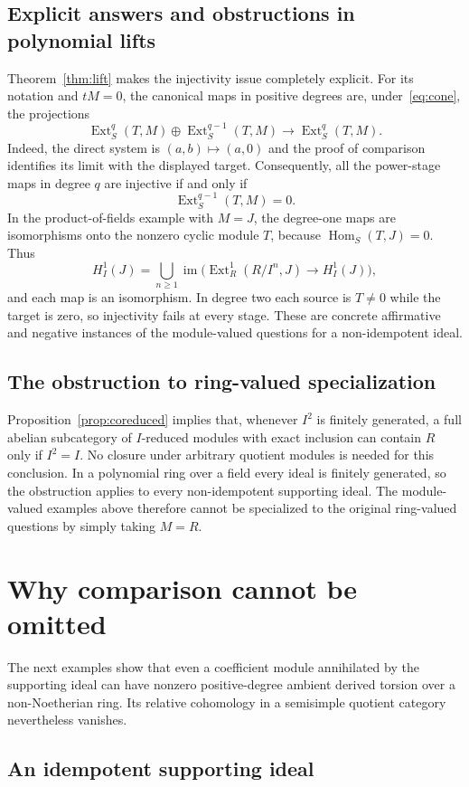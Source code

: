 \documentclass[11pt,reqno]{amsart}
\theoremstyle{definition}
\theoremstyle{remark}
\newcommand{\Hom}{\operatorname{Hom}}
\newcommand{\Ext}{\operatorname{Ext}}
\begin{document}
\subsection{Explicit answers and obstructions in polynomial lifts}
Theorem~\ref{thm:lift} makes the injectivity issue completely explicit. For its notation and $tM=0$, the canonical maps in positive degrees are, under~\eqref{eq:cone}, the projections
\[
\Ext_S^q(T,M)\oplus\Ext_S^{q-1}(T,M)
\longrightarrow\Ext_S^q(T,M).
\]
Indeed, the direct system is $(a,b)\mapsto(a,0)$ and the proof of comparison identifies its limit with the displayed target. Consequently, all the power-stage maps in degree $q$ are injective if and only if
\[
\Ext_S^{q-1}(T,M)=0.
\]
In the product-of-fields example with $M=J$, the degree-one maps are isomorphisms onto the nonzero cyclic module $T$, because $\Hom_S(T,J)=0$. Thus
\[
H_I^1(J)=\bigcup_{n\geq1}\operatorname{im}\bigl(\Ext_R^1(R/I^n,J)\to H_I^1(J)\bigr),
\]
and each map is an isomorphism. In degree two each source is $T\ne0$ while the target is zero, so injectivity fails at every stage. These are concrete affirmative and negative instances of the module-valued questions for a non-idempotent ideal.

\subsection{The obstruction to ring-valued specialization}
Proposition~\ref{prop:coreduced} implies that, whenever $I^2$ is finitely generated, a full abelian subcategory of $I$-reduced modules with exact inclusion can contain $R$ only if $I^2=I$. No closure under arbitrary quotient modules is needed for this conclusion. In a polynomial ring over a field every ideal is finitely generated, so the obstruction applies to every non-idempotent supporting ideal. The module-valued examples above therefore cannot be specialized to the original ring-valued questions by simply taking $M=R$.

\section{Why comparison cannot be omitted}
The next examples show that even a coefficient module annihilated by the supporting ideal can have nonzero positive-degree ambient derived torsion over a non-Noetherian ring. Its relative cohomology in a semisimple quotient category nevertheless vanishes.
\subsection{An idempotent supporting ideal}\label{subsec:counterexample}
\end{document}
